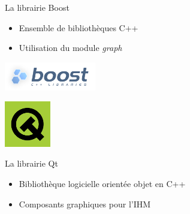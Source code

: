 {\begin{minipage}{0.45\textwidth}
\begin{flushleft}
\begin{block}{La librairie Boost}
\begin{itemize}
\item Ensemble de biblioth\`eques C++
\item Utilisation du module \textit{graph}
 \end{itemize}
\end{block}
\end{flushleft}
\end{minipage}
\hfill
\begin{minipage}{0.45\textwidth}
\begin{flushright}
\begin{center}
\includegraphics[width=4cm]{logo-boost.png}
\end{center}
\end{flushright}
\end{minipage}
\vfill
\begin{minipage}{0.45\textwidth}
\begin{flushleft}
\begin{center}
\includegraphics[width=2cm]{logo-qt.png}
\end{center}
\end{flushleft}
\end{minipage}
\hfill
\begin{minipage}{0.45\textwidth}
\begin{flushright}
\begin{block}{La librairie Qt}
\begin{itemize}
\item Biblioth\`eque logicielle orient\'ee objet en C++
\item Composants graphiques pour l'IHM
\end{itemize}
\end{block}
\end{flushright}
\end{minipage}
}